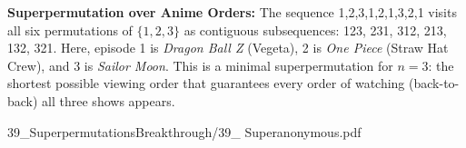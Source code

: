\begin{SideNotePage}{
  \textbf{Superpermutation over Anime Orders:}  
  The sequence 1,2,3,1,2,1,3,2,1 visits all six permutations of $\{1,2,3\}$ as contiguous subsequences: 123, 231, 312, 213, 132, 321. Here, episode \QSOpen{}1\QSClose{} is \emph{Dragon Ball Z} (Vegeta), \QSOpen{}2\QSClose{} is \emph{One Piece} (Straw Hat Crew), and \QSOpen{}3\QSClose{} is \emph{Sailor Moon}. This is a minimal superpermutation for $n=3$: the shortest possible viewing order that guarantees every order of watching (back-to-back) all three shows appears. \par
  }{39_SuperpermutationsBreakthrough/39_ Superanonymous.pdf}
\end{SideNotePage}
